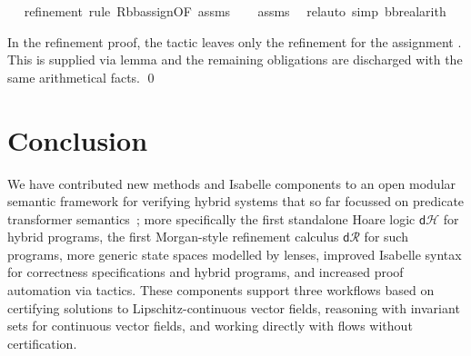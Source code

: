 \documentclass[envcountsame,envcountsect]{llncs}
\newcommand{\dH}{\mathsf{d}\mathcal{H}}
\newcommand{\dR}{\mathsf{d}\mathcal{R}}
\begin{document}
\begin{example}
\begin{isabellebody}
\ \ \isamarkupfalse%
{\isacharparenleft}refinement{\isacharsemicolon}\ {\isacharparenleft}rule\ R{\isacharunderscore}bb{\isacharunderscore}assign{\isacharbrackleft}OF\ assms{\isacharbrackright}{\isacharparenright}{\isacharquery}{\isacharparenright}\isanewline
\ \ \isamarkupfalse%
\ assms\ \isamarkupfalse%
\ {\isacharparenleft}rel{\isacharunderscore}auto{\isacharprime}\ simp{\isacharcolon}\ bb{\isacharunderscore}real{\isacharunderscore}arith{\isacharparenright}\isanewline
\end{isabellebody}
\noindent %
In the
refinement proof, the tactic leaves only the refinement for the
assignment . This is supplied via lemma
 and the
remaining obligations are discharged with the same arithmetical
facts. \qed
\end{example}




\section{Conclusion}\label{sec:conclusion}

We have contributed new methods and Isabelle components to an open
modular semantic framework for verifying hybrid systems that so far
focussed on predicate transformer semantics~\cite{MuniveS19}; more
specifically the first standalone Hoare logic $\dH$ for hybrid
programs, the first Morgan-style refinement calculus $\dR$ for such
programs, more generic state spaces modelled by lenses, improved
Isabelle syntax for correctness specifications and hybrid programs,
and increased proof automation via tactics.  These components support
three workflows based on certifying solutions to Lipschitz-continuous
vector fields, reasoning with invariant sets for continuous vector
fields, and working directly with flows without certification.
\end{document}
